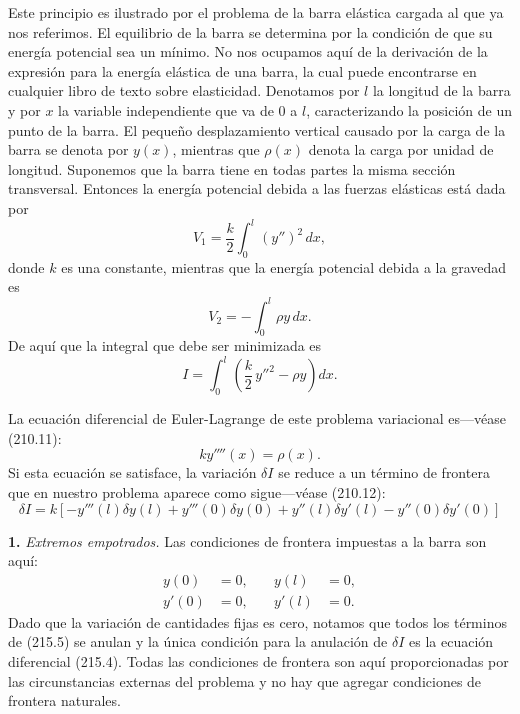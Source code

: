 \documentclass[12pt,a4paper]{book}
\begin{document}
Este principio es ilustrado por el problema de la barra elástica cargada al que ya nos referimos. El equilibrio de la barra se determina por la condición de que su energía potencial sea un mínimo. No nos ocupamos aquí de la derivación de la expresión para la energía elástica de una barra, la cual puede encontrarse en cualquier libro de texto sobre elasticidad. Denotamos por $l$ la longitud de la barra y por $x$ la variable independiente que va de 0 a $l$, caracterizando la posición de un punto de la barra. El pequeño desplazamiento vertical causado por la carga de la barra se denota por $y(x)$, mientras que $\rho(x)$ denota la carga por unidad de longitud. Suponemos que la barra tiene en todas partes la misma sección transversal. Entonces la energía potencial debida a las fuerzas elásticas está dada por
\begin{equation}
V_1 = \frac{k}{2} \int_0^l (y'')^2 \, dx, \tag{215.1}
\end{equation}
donde $k$ es una constante, mientras que la energía potencial debida a la gravedad es
\begin{equation}
V_2 = -\int_0^l \rho y \, dx. \tag{215.2}
\end{equation}
De aquí que la integral que debe ser minimizada es
\begin{equation}
I = \int_0^l \left( \frac{k}{2} \, y''^2 - \rho y \right) dx. \tag{215.3}
\end{equation}

La ecuación diferencial de Euler-Lagrange de este problema variacional es---véase (210.11):
\begin{equation}
ky''''(x) = \rho(x). \tag{215.4}
\end{equation}
Si esta ecuación se satisface, la variación $\delta I$ se reduce a un término de frontera que en nuestro problema aparece como sigue---véase (210.12):
\begin{equation}
\delta I = k \left[ -y'''(l)\delta y(l) + y'''(0)\delta y(0) + y''(l)\delta y'(l) - y''(0)\delta y'(0) \right] \tag{215.5}
\end{equation}

\textbf{1.} \textit{Extremos empotrados.} Las condiciones de frontera impuestas a la barra son aquí:
\begin{equation}
\begin{aligned}
y(0) &= 0, &\quad y(l) &= 0, \\
y'(0) &= 0, &\quad y'(l) &= 0.
\end{aligned} \tag{215.6}
\end{equation}
Dado que la variación de cantidades fijas es cero, notamos que todos los términos de (215.5) se anulan y la única condición para la anulación de $\delta I$ es la ecuación diferencial (215.4). Todas las condiciones de frontera son aquí proporcionadas por las circunstancias externas del problema y no hay que agregar condiciones de frontera naturales.
\end{document}
